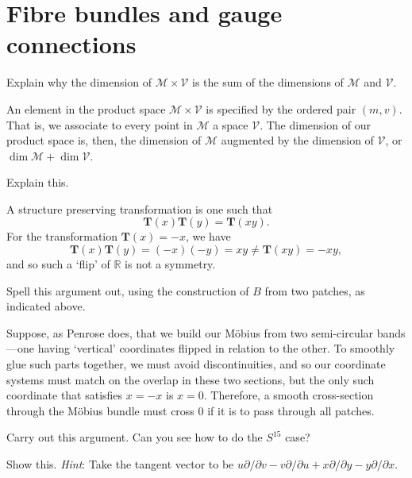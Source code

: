 \documentclass[../the-road-to-reality.tex]{subfiles}
\begin{document}
\section{Fibre bundles and gauge connections}

\begin{questions}

  \question Explain why the dimension of $\mathcal{M}\times\mathcal{V}$ is the
  sum of the dimensions of $\mathcal{M}$ and $\mathcal{V}$.

  \begin{solution}
    An element in the product space $\mathcal{M}\times\mathcal{V}$ is specified
    by the ordered pair $(m, v)$. That is, we associate to every point in $\mathcal{M}$
    a space $\mathcal{V}$. The dimension of our product space is, then, the
    dimension of $\mathcal{M}$ augmented by the dimension of $\mathcal{V}$, or
    $\dim\mathcal{M} + \dim\mathcal{V}$.
  \end{solution}

  \question Explain this.

  \begin{solution}
    A structure preserving transformation is one such that
    \[
      \mathbf{T}(x)\mathbf{T}(y) = \mathbf{T}(xy).
    \]
    For the transformation $\mathbf{T}(x) = -x$, we have
    \[
      \mathbf{T}(x)\mathbf{T}(y) = (-x)(-y) = xy \neq \mathbf{T}(xy) = -xy,
    \]
    and so such a `flip' of $\mathbb{R}$ is not a symmetry.
  \end{solution}

  \question Spell this argument out, using the construction of $B$ from two
  patches, as indicated above.

  \begin{solution}
    Suppose, as Penrose does, that we build our M{\"o}bius from two
    semi-circular bands---one having `vertical' coordinates flipped in relation
    to the other. To smoothly glue such parts together, we must avoid
    discontinuities, and so our coordinate systems must match on the overlap in
    these two sections, but the only such coordinate that satisfies $x=-x$ is
    $x=0$. Therefore, a smooth cross-section through the M{\"o}bius bundle must
    cross $0$ if it is to pass through all patches.
  \end{solution}

  \question Carry out this argument. Can you see how to do the $S^{15}$ case?

  \question Show this. \textit{Hint}: Take the tangent vector to be
  $u\partial/\partial{v} - v\partial/\partial{u} + x\partial/\partial{y} - y\partial/\partial{x}$.


\end{questions}
\end{document}
